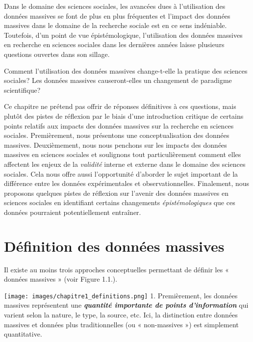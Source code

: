 \documentclass[
  letterpaper,
  DIV=11,
  numbers=noendperiod]{scrreprt}
\begin{document}
Dans le domaine des sciences sociales, les avancées dues à l'utilisation
des données massives se font de plus en plus fréquentes et l'impact des
données massives dans le domaine de la recherche sociale est en ce sens
indéniable. Toutefois, d'un point de vue épistémologique, l'utilisation
des données massives en recherche en sciences sociales dans les
dernières années laisse plusieurs questions ouvertes dans son sillage.

Comment l'utilisation des données massives change-t-elle la pratique des
sciences sociales? Les données massives causeront-elles un changement de
paradigme scientifique?

Ce chapitre ne prétend pas offrir de réponses définitives à ces
questions, mais plutôt des pistes de réflexion par le biais d'une
introduction critique de certains points relatifs aux impacts des
données massives sur la recherche en sciences sociales. Premièrement,
nous présentons une conceptualisation des données massives.
Deuxièmement, nous nous penchons sur les impacts des données massives en
sciences sociales et soulignons tout particulièrement comment elles
affectent les enjeux de la \emph{validité} interne et externe dans le
domaine des sciences sociales. Cela nous offre aussi l'opportunité
d'aborder le sujet important de la différence entre les données
expérimentales et observationnelles. Finalement, nous proposons quelques
pistes de réflexion sur l'avenir des données massives en sciences
sociales en identifiant certains changements \emph{épistémologiques} que
ces données pourraient potentiellement entraîner.

\section*{Définition des données
massives}\label{duxe9finition-des-donnuxe9es-massives}


Il existe au moins trois approches conceptuelles permettant de définir
les « données massives » (voir Figure 1.1.).

\texttt{[image: images/chapitre1\_definitions.png]} 1. Premièrement, les
données massives représentent une \textbf{\emph{quantité importante de
points d'information}} qui varient selon la nature, le type, la source,
etc. Ici, la distinction entre données massives et données plus
traditionnelles (ou « non-massives ») est simplement quantitative.
\end{document}
